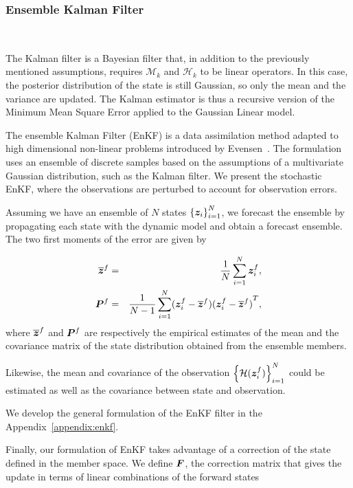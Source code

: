 \subsubsection{Ensemble Kalman Filter}~{\label{enkf}}

The Kalman filter \cite{kalman_new_1960} is a Bayesian filter that, in addition to the previously mentioned assumptions, requires $\mathcal{M}_k$ and $\mathcal{H}_k$ to be linear operators. In this case, the posterior distribution of the state is still Gaussian, so only the mean and the variance are updated. The Kalman estimator is thus a recursive version of the Minimum Mean Square Error applied to the Gaussian Linear model.

The ensemble Kalman Filter (EnKF) is a data assimilation method adapted to high dimensional non-linear problems introduced by Evensen~\cite{evensen_sequential_1994}. The formulation uses an ensemble of discrete samples based on the assumptions of a multivariate Gaussian distribution, such as the Kalman filter. We present the stochastic EnKF, where the observations are perturbed to account for observation errors.

Assuming we have an ensemble of $N$ states $\left\{\bm {\bm{z}}_i \right\}_{i=1}^N$, we forecast the ensemble by propagating each state with the dynamic model and obtain a forecast ensemble.
The two first moments of the error are given by

\begin{eqnarray*}
    \overline{\bm{z}}^f &=& \frac{1}{N} \sum_{i = 1}^{N} \bm{z}_i^f, \\
    \bm{P}^f &=& \frac{1}{N-1} \sum_{i = 1}^{N} (\bm{z}_i^f - \overline{\bm{z}}^f){(\bm{z}_i^f - \overline{\bm{z}}^f)}^T,
\end{eqnarray*}
where $\overline{\bm{z}}^f$ and $\bm{P}^f$ are respectively the empirical estimates of the mean and  the covariance matrix of the state distribution obtained from the ensemble members.

Likewise, the mean and covariance of the observation $\left\{\mathcal{H}(\bm{z}_i^f) \right\}_{i=1}^N$ could be estimated as well as the covariance between state and observation.

We develop the general formulation of the EnKF filter in the Appendix~\ref{appendix:enkf}.

Finally, our formulation of EnKF takes advantage of a correction of the state defined in the member space. We define $\bm{F}$, the correction matrix that gives the update in terms of linear combinations of the forward states

